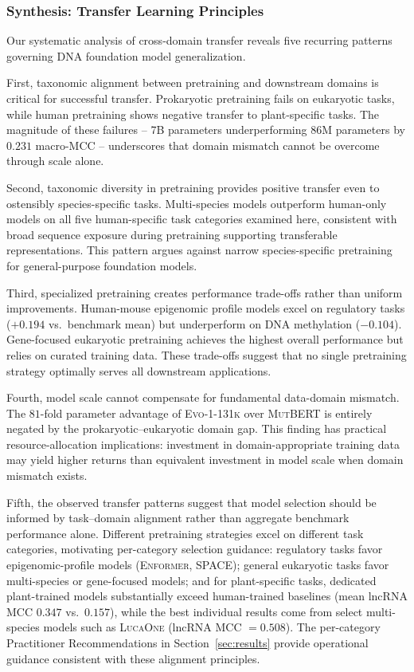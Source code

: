 \documentclass{llmxive}
\begin{document}
\subsubsection{Synthesis: Transfer Learning Principles}

Our systematic analysis of cross-domain transfer reveals five
recurring patterns governing DNA foundation model generalization.

First, taxonomic alignment between pretraining and downstream
domains is critical for successful transfer. Prokaryotic
pretraining fails on eukaryotic tasks, while human pretraining
shows negative transfer to plant-specific tasks. The magnitude of
these failures -- 7B parameters underperforming 86M parameters by
$0.231$ macro-MCC -- underscores that domain mismatch cannot be
overcome through scale alone.

Second, taxonomic diversity in pretraining provides positive
transfer even to ostensibly species-specific tasks. Multi-species
models outperform human-only models on all five human-specific
task categories examined here, consistent with broad sequence
exposure during pretraining supporting transferable
representations. This pattern argues against narrow
species-specific pretraining for general-purpose foundation
models.

Third, specialized pretraining creates performance trade-offs
rather than uniform improvements. Human-mouse epigenomic profile
models excel on regulatory tasks ($+0.194$ vs.\ benchmark mean)
but underperform on DNA methylation ($-0.104$). Gene-focused
eukaryotic pretraining achieves the highest overall performance
but relies on curated training data. These trade-offs suggest that
no single pretraining strategy optimally serves all downstream
applications.

Fourth, model scale cannot compensate for fundamental data-domain
mismatch. The $81$-fold parameter advantage of \textsc{Evo-1-131k}
over \textsc{MutBERT} is entirely negated by the
prokaryotic--eukaryotic domain gap. This finding has practical
resource-allocation implications: investment in domain-appropriate
training data may yield higher returns than equivalent investment
in model scale when domain mismatch exists.

Fifth, the observed transfer patterns suggest that model selection
should be informed by task--domain alignment rather than aggregate
benchmark performance alone. Different pretraining strategies
excel on different task categories, motivating per-category
selection guidance: regulatory tasks favor epigenomic-profile
models (\textsc{Enformer}, \textsc{SPACE}); general eukaryotic
tasks favor multi-species or gene-focused models; and for
plant-specific tasks, dedicated plant-trained models substantially
exceed human-trained baselines (mean lncRNA MCC $0.347$ vs.\
$0.157$), while the best individual results come from select
multi-species models such as \textsc{LucaOne} (lncRNA MCC $=
0.508$). The per-category Practitioner Recommendations in
Section~\ref{sec:results} provide operational guidance consistent
with these alignment principles.
\end{document}
